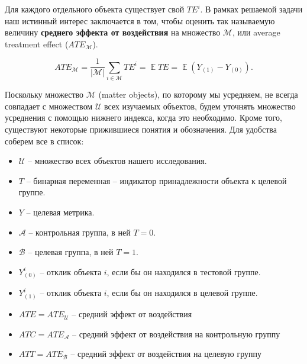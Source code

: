 \documentclass{article}
\DeclareMathOperator{\E}{\mathbb{E}}
\begin{document}
        Для каждого отдельного объекта существует свой $TE^i$.
        В рамках решаемой задачи наш истинный интерес заключается в том, чтобы оценить так называемую величину \textbf{среднего эффекта от воздействия} на множество $\mathcal{M}$, или average treatment effect ($ATE_\mathcal{M}$).

        \[
        ATE_{\mathcal{M}}=
        \frac{1}{|\mathcal{M}|} \displaystyle\sum_{i\in\mathcal{M}}TE^i=
        \E{}TE=
        \E{}(Y_{(1)}-Y_{(0)}).
        \]

        Поскольку множество $\mathcal{M}$ (matter objects), по которому мы усредняем, не всегда совпадает с множеством $\mathcal{U}$ всех изучаемых объектов, будем уточнять множество усреднения с помощью нижнего индекса, когда это необходимо.
        Кроме того, существуют некоторые прижившиеся понятия и обозначения.
        Для удобства соберем все в список:

        \begin{itemize}
            \item $\mathcal{U}$ -- множество всех объектов нашего исследования.

            \item $T$ -- бинарная переменная -- индикатор принадлежности объекта к целевой группе.

            \item \( Y \) -- целевая метрика.

            \item $\mathcal{A}$ -- контрольная группа, в ней $T = 0$.

            \item $\mathcal{B}$ -- целевая группа, в ней $T = 1$.

            \item $Y^i_{(0)}$ -- отклик объекта $i$, если бы он находился в тестовой группе.

            \item $Y^i_{(1)}$ -- отклик объекта $i$, если бы он находился в целевой группе.

            \item $ATE = ATE_\mathcal{U}$ -- средний эффект от воздействия

            \item $ATC = ATE_\mathcal{A}$ -- средний эффект от воздействия на контрольную группу

            \item $ATT = ATE_\mathcal{B}$ -- средний эффект от воздействия на целевую группу

        \end{itemize}
\end{document}
